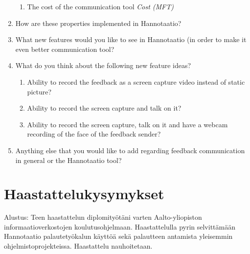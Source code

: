 \documentclass[english,12pt,a4paper,pdftex]{article}
\begin{document}
\begin{enumerate}
\begin{enumerate}
    \item The cost of the communication tool \emph{Cost (MFT)}
    
  \end{enumerate}

\item How are these properties implemented in Hannotaatio?

\item What new features would you like to see in Hannotaatio (in order to make it even better communication tool?

\item What do you think about the following new feature ideas?

  \begin{enumerate}
    \item Ability to record the feedback as a screen capture video instead of static picture?
    \item Ability to record the screen capture and talk on it?
    \item Ability to record the screen capture, talk on it and have a webcam recording of the face of the feedback sender?
  \end{enumerate}

\item Anything else that you would like to add regarding feedback communication in general or the Hannotaatio tool?
  
\end{enumerate}

\clearpage

\section{Haastattelukysymykset}
\label{appendix:haastattelu_kysymykset}

Alustus: Teen haastattelun diplomityötäni varten Aalto-yliopiston informaatioverkostojen koulutusohjelmaan. Haastattelulla pyrin selvittämään Hannotaatio palautetyökalun käyttöä sekä palautteen antamista yleisemmin ohjelmistoprojekteissa. Haastattelu nauhoitetaan. 
\end{document}
